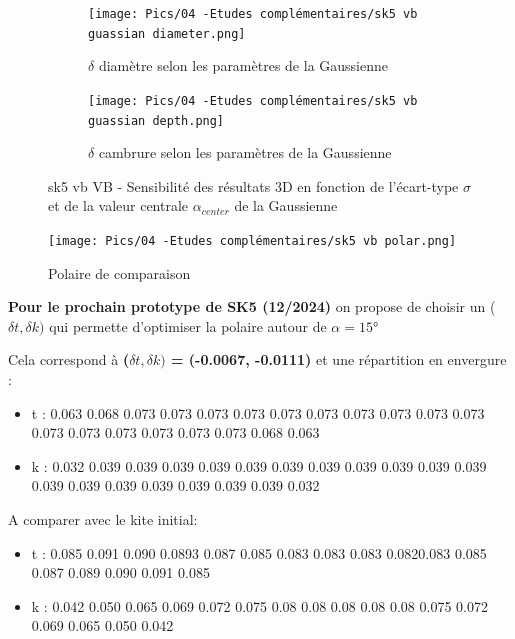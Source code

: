 \begin{figure}[H]
    \centering
    \begin{subfigure}[b]{0.45\textwidth}
        \centering
        \texttt{[image: Pics/04 -Etudes complémentaires/sk5 vb guassian diameter.png]}
        \caption{$\delta$ diamètre selon les paramètres de la Gaussienne}
        \label{fig:diametre gaussien sk5 vb}
    \end{subfigure}
    \hfill
    \begin{subfigure}[b]{0.45\textwidth}
        \centering
        \texttt{[image: Pics/04 -Etudes complémentaires/sk5 vb guassian depth.png]}
        \caption{$\delta$ cambrure selon les paramètres de la Gaussienne}
        \label{fig:cambrure gaussien sk5 vb}
    \end{subfigure}
    \caption{sk5 vb VB - Sensibilité des résultats 3D en fonction de l'écart-type $\sigma$ et de la valeur centrale $\alpha_{center}$ de la Gaussienne}
    \label{fig:gaussian sensibility sk5 vb}
\end{figure}

\begin{figure}[H]
    \centering
    \texttt{[image: Pics/04 -Etudes complémentaires/sk5 vb polar.png]}
    \caption{Polaire de comparaison}
    \label{fig:polar sk5 vb}
\end{figure}

\textbf{Pour le prochain prototype de SK5 (12/2024)} on propose de choisir un ($\delta t, \delta k)$ qui permette d'optimiser la polaire autour de $\alpha = 15$°

Cela correspond à \textbf{($\delta t, \delta k)$ = (-0.0067, -0.0111)} et une répartition en envergure :
\begin{itemize}
    \item t : 0.063 0.068 0.073 0.073 0.073 0.073 0.073 0.073 0.073 0.073 0.073 0.073 0.073 0.073 0.073 0.073 0.073 0.073 0.068 0.063
    \item k : 0.032 0.039 0.039 0.039 0.039 0.039 0.039 0.039 0.039 0.039 0.039 0.039 0.039 0.039 0.039 0.039 0.039 0.039 0.039 0.032
\end{itemize}

A comparer avec le kite initial:
\begin{itemize}
    \item t : 0.085 0.091 0.090 0.0893 0.087 0.085 0.083 0.083 0.083 0.0820.083 0.085 0.087 0.089 0.090 0.091 0.085
    \item k : 0.042 0.050 0.065 0.069 0.072 0.075 0.08 0.08 0.08 0.08 0.08 0.075 0.072 0.069 0.065 0.050 0.042   
\end{itemize}

